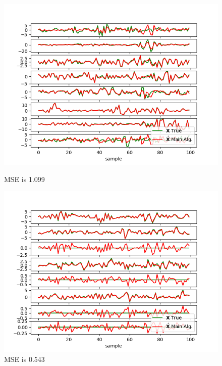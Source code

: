 \begin{figure}[H]
    \begin{minipage}[t]{.45\textwidth}
		\centering
		\includegraphics[scale=0.5]{figures/ch_estimate/k_test2.png}
	\caption{MSE is 1.099}
	\label{fig:ktest2}
    \end{minipage} 
    \hfill
    \begin{minipage}[t]{.45\textwidth}
		\centering
		\includegraphics[scale=0.5]{figures/ch_estimate/k_test3.png}
	\caption{MSE is 0.543}
	\label{fig:ktest3}
    \end{minipage}
\end{figure}

